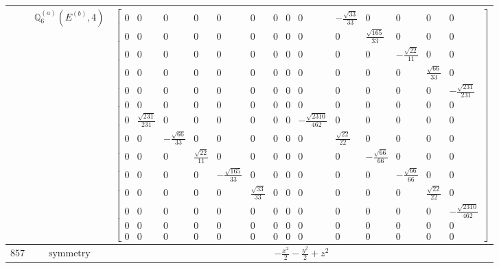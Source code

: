 \documentclass[fleqn,8pt,landscape]{jsarticle}
\begin{document}
\begin{longtable}{ccc}
$  $ & $ \mathbb{Q}_{6}^{(a)}(E^{(b)},4) $ & $ \begin{bmatrix} 0 & 0 & 0 & 0 & 0 & 0 & 0 & 0 & 0 & - \frac{\sqrt{33}}{33} & 0 & 0 & 0 & 0 \\ 0 & 0 & 0 & 0 & 0 & 0 & 0 & 0 & 0 & 0 & \frac{\sqrt{165}}{33} & 0 & 0 & 0 \\ 0 & 0 & 0 & 0 & 0 & 0 & 0 & 0 & 0 & 0 & 0 & - \frac{\sqrt{22}}{11} & 0 & 0 \\ 0 & 0 & 0 & 0 & 0 & 0 & 0 & 0 & 0 & 0 & 0 & 0 & \frac{\sqrt{66}}{33} & 0 \\ 0 & 0 & 0 & 0 & 0 & 0 & 0 & 0 & 0 & 0 & 0 & 0 & 0 & - \frac{\sqrt{231}}{231} \\ 0 & 0 & 0 & 0 & 0 & 0 & 0 & 0 & 0 & 0 & 0 & 0 & 0 & 0 \\ 0 & \frac{\sqrt{231}}{231} & 0 & 0 & 0 & 0 & 0 & 0 & - \frac{\sqrt{2310}}{462} & 0 & 0 & 0 & 0 & 0 \\ 0 & 0 & - \frac{\sqrt{66}}{33} & 0 & 0 & 0 & 0 & 0 & 0 & \frac{\sqrt{22}}{22} & 0 & 0 & 0 & 0 \\ 0 & 0 & 0 & \frac{\sqrt{22}}{11} & 0 & 0 & 0 & 0 & 0 & 0 & - \frac{\sqrt{66}}{66} & 0 & 0 & 0 \\ 0 & 0 & 0 & 0 & - \frac{\sqrt{165}}{33} & 0 & 0 & 0 & 0 & 0 & 0 & - \frac{\sqrt{66}}{66} & 0 & 0 \\ 0 & 0 & 0 & 0 & 0 & \frac{\sqrt{33}}{33} & 0 & 0 & 0 & 0 & 0 & 0 & \frac{\sqrt{22}}{22} & 0 \\ 0 & 0 & 0 & 0 & 0 & 0 & 0 & 0 & 0 & 0 & 0 & 0 & 0 & - \frac{\sqrt{2310}}{462} \\ 0 & 0 & 0 & 0 & 0 & 0 & 0 & 0 & 0 & 0 & 0 & 0 & 0 & 0 \\ 0 & 0 & 0 & 0 & 0 & 0 & 0 & 0 & 0 & 0 & 0 & 0 & 0 & 0 \end{bmatrix} $ \\ \hline
$ 857 $ & $ \text{symmetry} $ & $ - \frac{x^{2}}{2} - \frac{y^{2}}{2} + z^{2} $ \\

\end{longtable}
\end{document}
